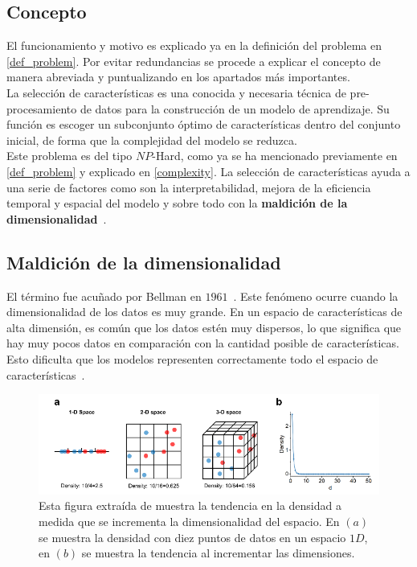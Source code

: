 \subsection{Concepto}
El funcionamiento y motivo es explicado ya en la definición del problema en \ref{def_problem}. Por evitar redundancias se procede a explicar el concepto de manera abreviada y puntualizando en los apartados más importantes.\\[6pt]
La selección de características es una conocida y necesaria técnica de pre-procesamiento de datos para la construcción de un modelo de aprendizaje. Su función es escoger un subconjunto óptimo de características dentro del conjunto inicial, de forma que la complejidad del modelo se reduzca.\\[6pt]
Este problema es del tipo $NP$-Hard, como ya se ha mencionado previamente en \ref{def_problem} y explicado en \ref{complexity}.
La selección de características ayuda a una serie de factores como son la interpretabilidad, mejora de la eficiencia temporal y espacial del modelo y sobre todo con la \textbf{maldición de la dimensionalidad}~\cite{venkat2018curse, bellman1957dynamic}.

\subsection{Maldición de la dimensionalidad}
El término fue acuñado por Bellman en $1961$~\cite{bellman1961adaptive}. Este fenómeno ocurre cuando la dimensionalidad de los datos es muy grande. En un espacio de características de alta dimensión, es común que los datos estén muy dispersos, lo que significa que hay muy pocos datos en comparación con la cantidad posible de características. Esto dificulta que los modelos representen correctamente todo el espacio de características~\cite{peng_interpreting_2024}.\\[6pt]

\begin{figure}[H]
    \begin{center}
        \includegraphics[width=1\textwidth]{imagenes/curse-dimen-example.png}
    \end{center}
    \caption[Tendencia de incremento de dimensionalidad en varios espacios de características]{Esta figura extraída de \cite{peng_interpreting_2024} muestra la tendencia en la densidad a medida que se incrementa la dimensionalidad del espacio. En $(a)$ se muestra la densidad con diez puntos de datos en un espacio $1D$, en $(b)$ se muestra la tendencia al incrementar las dimensiones.}
\end{figure}

